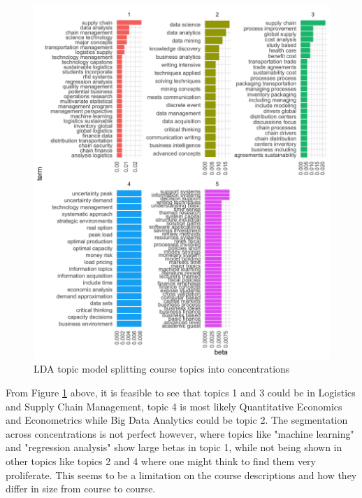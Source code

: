 \begin{figure}[H]
\centering

\includegraphics[width = .9\textwidth, height = .8\textheight]{Content/images/lda.png}
\caption{LDA topic model splitting course topics into concentrations}
\label{fig:lda}
\end{figure}

From Figure \ref{fig:lda} above, it is feasible to see that topics 1 and 3 could be in Logistics and Supply Chain Management, topic 4 is most likely Quantitative Economics and Econometrics while Big Data Analytics could be topic 2. The segmentation across concentrations is not perfect however, where topics like "machine learning" and "regression analysis" show large betas in topic 1, while not being shown in other topics like topics 2 and 4 where one might think to find them very proliferate. This seems to be a limitation on the course descriptions and how they differ in size from course to course.  

